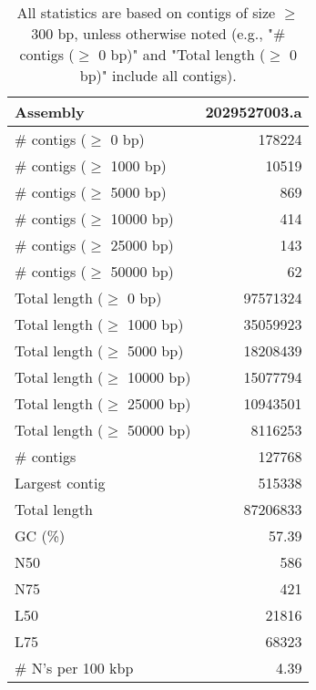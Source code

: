 \documentclass[12pt,a4paper]{article}
\begin{document}
\begin{table}[ht]
\begin{center}
\caption{All statistics are based on contigs of size $\geq$ 300 bp, unless otherwise noted (e.g., "\# contigs ($\geq$ 0 bp)" and "Total length ($\geq$ 0 bp)" include all contigs).}
\begin{tabular}{|l*{1}{|r}|}
\hline
Assembly & 2029527003.a \\ \hline
\# contigs ($\geq$ 0 bp) & 178224 \\ \hline
\# contigs ($\geq$ 1000 bp) & 10519 \\ \hline
\# contigs ($\geq$ 5000 bp) & 869 \\ \hline
\# contigs ($\geq$ 10000 bp) & 414 \\ \hline
\# contigs ($\geq$ 25000 bp) & 143 \\ \hline
\# contigs ($\geq$ 50000 bp) & 62 \\ \hline
Total length ($\geq$ 0 bp) & 97571324 \\ \hline
Total length ($\geq$ 1000 bp) & 35059923 \\ \hline
Total length ($\geq$ 5000 bp) & 18208439 \\ \hline
Total length ($\geq$ 10000 bp) & 15077794 \\ \hline
Total length ($\geq$ 25000 bp) & 10943501 \\ \hline
Total length ($\geq$ 50000 bp) & 8116253 \\ \hline
\# contigs & 127768 \\ \hline
Largest contig & 515338 \\ \hline
Total length & 87206833 \\ \hline
GC (\%) & 57.39 \\ \hline
N50 & 586 \\ \hline
N75 & 421 \\ \hline
L50 & 21816 \\ \hline
L75 & 68323 \\ \hline
\# N's per 100 kbp & 4.39 \\ \hline
\end{tabular}
\end{center}
\end{table}
\end{document}

